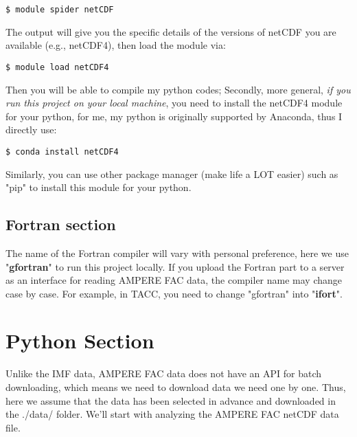 \documentclass[12pt, letterpaper]{article} %
\begin{document}
\begin{verbatim}
$ module spider netCDF
\end{verbatim} %

\noindent The output will give you the specific details of the versions of netCDF you are available (e.g., netCDF4), then load the module via:

\begin{verbatim}
$ module load netCDF4
\end{verbatim} %

\noindent Then you will be able to compile my python codes; Secondly, more general, \emph{if you run this project on your local machine}, you need to install the netCDF4 module for your python, for me, my python is originally supported by Anaconda, thus I directly use:

\begin{verbatim}
$ conda install netCDF4
\end{verbatim} %

\noindent Similarly, you can use other package manager (make life a LOT easier) such as "pip" to install this module for your python. 

\subsection{Fortran section}

\noindent The name of the Fortran compiler will vary with personal preference, here we use "\textbf{gfortran}" to run this project locally. If you upload the Fortran part to a server as an interface for reading AMPERE FAC data, the compiler name may change case by case. For example, in TACC, you need to change "gfortran" into "\textbf{ifort}". 



\section{Python Section} %

\noindent  Unlike the IMF data, AMPERE FAC data does not have an API for batch downloading, which means we need to download data we need one by one. Thus, here we assume that the data has been selected in advance and downloaded in the ./data/ folder. We'll start with analyzing the AMPERE FAC netCDF data file.
\end{document}
